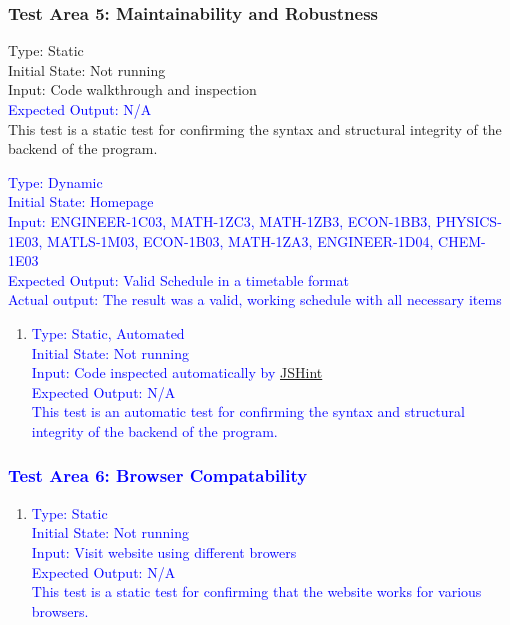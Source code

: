 \documentclass[11pt, oneside]{article}   	%
\begin{document}
\subsubsection{Test Area 5: Maintainability and Robustness}
\begin{enumerate}
\item Type: Static \\
Initial State: Not running \\
Input: Code walkthrough and inspection\\
\textcolor{blue}{Expected Output: N/A} \\
This test is a static test for confirming the syntax and structural integrity of the backend of the program.\\


\textcolor{blue}{
\item Type: Dynamic \\
Initial State: Homepage \\
Input: ENGINEER-1C03, MATH-1ZC3, MATH-1ZB3,  ECON-1BB3, PHYSICS-1E03, MATLS-1M03, ECON-1B03, MATH-1ZA3, ENGINEER-1D04, CHEM-1E03\\
Expected Output: Valid Schedule in a timetable format \\
Actual output: The result was a valid, working schedule with all necessary items
}
\end{enumerate}

\begin{enumerate}
\item \textcolor{blue}{Type: Static, Automated \\
Initial State: Not running \\
Input: Code inspected automatically by \href{http://jshint.com}{JSHint}} \\
\textcolor{blue}{Expected Output: N/A \\
This test is an automatic test for confirming the syntax and structural integrity of the backend of the program.}\\ 
\end{enumerate}

\textcolor{blue}{
\subsubsection{Test Area 6: Browser Compatability}}
\begin{enumerate}
\item \textcolor{blue}{Type: Static \\
Initial State: Not running \\
Input: Visit website using different browers\\}
\textcolor{blue}{Expected Output: N/A \\
This test is a static test for confirming that the website works for various browsers. } \\
\end{enumerate}
\end{document}
